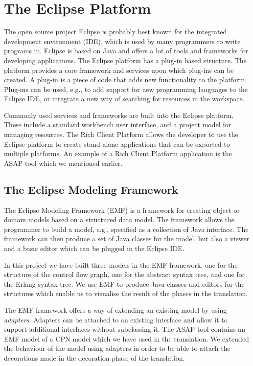 \section{The Eclipse Platform}
The open source project Eclipse \cite{RefWorks:86} is probably best known for the integrated development environment (IDE), which is used by many programmers to write programs in. Eclipse is based on Java and offers a lot of tools and frameworks for developing applications. The Eclipse platform has a plug-in based structure. The platform provides a core framework and services upon which plug-ins can be created. A plug-in is a piece of code that adds new functionality to the platform. Plug-ins can be used, e.g., to add support for new programming languages to the Eclipse IDE, or integrate a new way of searching for resources in the workspace.

Commonly used services and frameworks are built into the Eclipse platform. These include a standard workbench user interface, and a project model for managing resources. The Rich Client Platform \cite{RefWorks:83} allows the developer to use the Eclipse platform to create stand-alone applications that can be exported to multiple platforms. An example of a Rich Client Platform application is the ASAP tool \cite{RefWorks:92} which we mentioned earlier.

\subsection{The Eclipse Modeling Framework}
The Eclipse Modeling Framework (EMF) \cite{RefWorks:85} is a framework for creating object or domain models based on a structured data model. The framework allows the programmer to build a model, e.g., specified as a collection of Java interface. The framework can then produce a set of Java classes for the model, but also a viewer and a basic editor which can be plugged in the Eclipse IDE.

In this project we have built three models in the EMF framework, one for the structure of the control flow graph, one for the abstract syntax tree, and one for the Erlang syntax tree. We use EMF to produce Java classes and editors for the structures which enable us to visualise the result of the phases in the translation.

The EMF framework offers a way of extending an existing model by using \emph{adapters}. Adapters can be attached to an existing interface and allow it to support additional interfaces without subclassing it. The ASAP tool contains an EMF model of a CPN model which we have used in the translation. We extended the behaviour of the model using adapters in order to be able to attach the decorations made in the decoration phase of the translation. 


